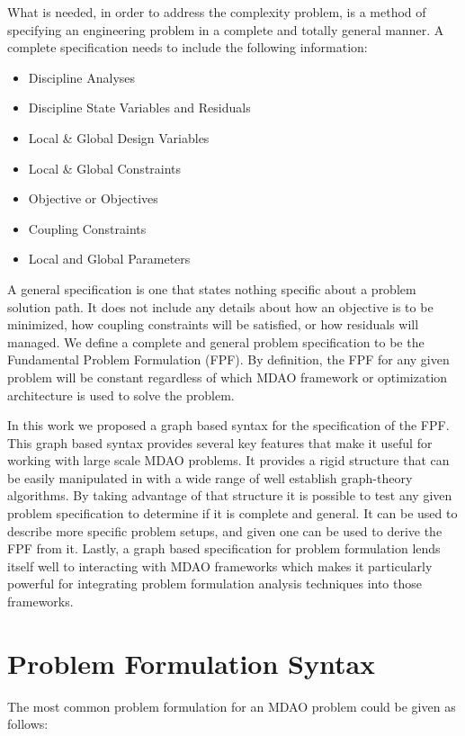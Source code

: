 \documentclass[]{aiaa-tc} %
\begin{document}
    What is needed, in order to address the complexity problem, is a method of specifying an engineering problem 
    in a complete and totally general manner. A complete specification needs to include the following information: 
    \begin{itemize}
       \item Discipline Analyses 
       \item Discipline State Variables and Residuals
       \item Local \& Global Design Variables
       \item Local \& Global Constraints
       \item Objective or Objectives
       \item Coupling Constraints
       \item Local and Global Parameters
    \end{itemize}
    A general specification is one that states nothing specific about a problem solution path. It does not include any details about 
    how an objective is to be minimized, how coupling constraints will be satisfied, or how residuals will managed. We 
    define a complete and general problem specification to be the Fundamental Problem Formulation (FPF). By definition, the FPF for 
    any given problem will be constant regardless of which MDAO framework or optimization architecture is used to solve the problem. 

    In this work we proposed a graph based syntax for the specification of the FPF. This graph based syntax provides several key
    features that make it useful for working with large scale MDAO problems. It provides a rigid structure that can be easily manipulated 
    in with a wide range of well establish graph-theory algorithms. By taking advantage of that structure it is possible to test 
    any given problem specification to determine if it is complete and general. It can be used to describe more specific problem 
    setups, and given one can be used to derive the FPF from it. Lastly, a graph based specification for problem formulation lends itself
    well to interacting with MDAO frameworks which makes it particularly powerful for integrating problem formulation analysis techniques 
    into those frameworks. 


\section{Problem Formulation Syntax}
    The most common problem formulation for an MDAO problem could be given as follows: 
\end{document}

